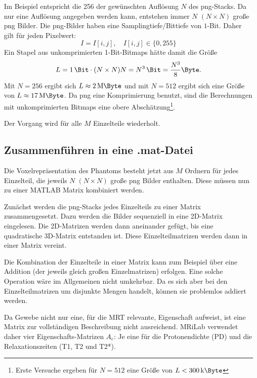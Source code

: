 Im Beispiel entspricht die 256 der gewünschten Auflösung $N$ des png-Stacks. Da nur eine Auflösung angegeben werden kann, entstehen immer $N$ $(N\times N)$ große png Bilder. Die png-Bilder haben eine Samplingtiefe/Bittiefe von $1$-Bit. Daher gilt für jeden Pixelwert:
\begin{equation}
	I = I[i,j] , \quad I[i,j] \in \{0, 255\}
\end{equation}
Ein Stapel aus unkomprimierten 1-Bit-Bitmaps hätte damit die Größe
\begin{equation}
	L=\SI{1}{\Bit} \cdot (N \times N) N = N^3 \,\SI{}{\Bit} = \frac{N^3}{8} \SI{}{\Byte}.
\end{equation}
Mit $N=256$ ergibt sich $L\approx \SI{2}{\mega\Byte}$ und mit $N=512$ ergibt sich eine Größe von $L\approx \SI{17}{\mega\Byte}$. Da png eine Komprimierung benutzt, sind die Berechnungen mit unkomprimierten Bitmaps eine obere Abschätzung\footnote{Erste Versuche ergeben für $N=512$ eine Größe von $L<\SI{300}{\kilo\Byte}$}.

Der Vorgang wird für alle $M$ Einzelteile wiederholt.

\subsection{Zusammenführen in eine .mat-Datei}
Die Voxelrepräsentation des Phantoms besteht jetzt aus $M$ Ordnern für jedes Einzelteil, die jeweils $N$ $(N \times N)$ große png Bilder enthalten. Diese müssen nun zu einer MATLAB Matrix kombiniert werden.

Zunächst werden die png-Stacks jedes Einzelteils zu einer Matrix zusammengesetzt. Dazu werden die Bilder sequenziell in eine 2D-Matrix eingelesen. Die 2D-Matrizen werden dann aneinander gefügt, bis eine quadratische 3D-Matrix entstanden ist. Diese Einzelteilmatrizen werden dann in einer Matrix vereint.

Die Kombination der Einzelteile in einer Matrix kann zum Beispiel über eine Addition (der jeweils gleich großen Einzelmatrizen) erfolgen. Eine solche Operation wäre im Allgemeinen nicht umkehrbar. Da es sich aber bei den Einzelteilmatrizen um disjunkte Mengen handelt, können sie problemlos addiert werden.

Da Gewebe nicht nur eine, für die MRT relevante, Eigenschaft aufweist, ist eine Matrix zur vollständigen Beschreibung nicht ausreichend. MRiLab verwendet daher vier Eigenschafts-Matrizen $A_e$: Je eine für die Protonendichte (PD) und die Relaxationszeiten (T1, T2 und T2*).

